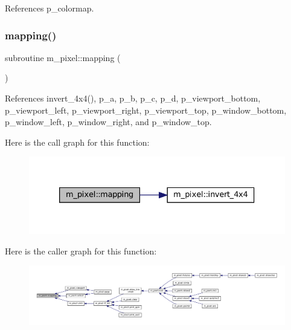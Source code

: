 References p\+\_\+colormap.

\mbox{\label{namespacem__pixel_a84c841de62fc0addddeff305c4ede9d4}} 
\subsubsection{\texorpdfstring{mapping()}{mapping()}}
{\footnotesize\ttfamily subroutine m\+\_\+pixel\+::mapping (\begin{DoxyParamCaption}{ }\end{DoxyParamCaption})\hspace{0.3cm}{\ttfamily [private]}}



References invert\+\_\+4x4(), p\+\_\+a, p\+\_\+b, p\+\_\+c, p\+\_\+d, p\+\_\+viewport\+\_\+bottom, p\+\_\+viewport\+\_\+left, p\+\_\+viewport\+\_\+right, p\+\_\+viewport\+\_\+top, p\+\_\+window\+\_\+bottom, p\+\_\+window\+\_\+left, p\+\_\+window\+\_\+right, and p\+\_\+window\+\_\+top.

Here is the call graph for this function\+:
\nopagebreak
\begin{figure}[H]
\begin{center}
\leavevmode
\includegraphics[width=333pt]{namespacem__pixel_a84c841de62fc0addddeff305c4ede9d4_cgraph}
\end{center}
\end{figure}
Here is the caller graph for this function\+:
\nopagebreak
\begin{figure}[H]
\begin{center}
\leavevmode
\includegraphics[width=350pt]{namespacem__pixel_a84c841de62fc0addddeff305c4ede9d4_icgraph}
\end{center}
\end{figure}
\mbox{\label{namespacem__pixel_ab5d4dc474ff84dc0f3f35f4a395979e0}} 

